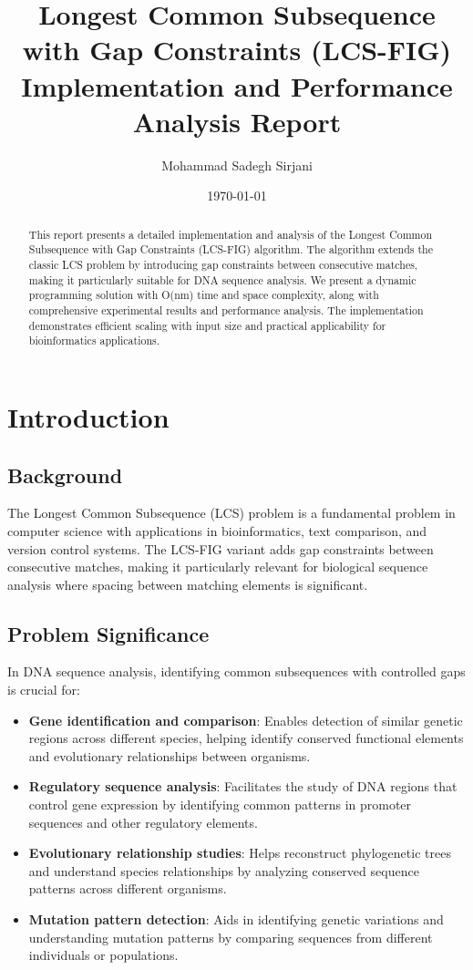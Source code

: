 \documentclass[12pt]{article}
\title{Longest Common Subsequence with Gap Constraints (LCS-FIG)\\
Implementation and Performance Analysis Report}
\author{Mohammad Sadegh Sirjani}
\date{\today}
\begin{document}
\maketitle

\begin{abstract}
This report presents a detailed implementation and analysis of the Longest Common Subsequence with Gap Constraints (LCS-FIG) algorithm. The algorithm extends the classic LCS problem by introducing gap constraints between consecutive matches, making it particularly suitable for DNA sequence analysis. We present a dynamic programming solution with O(nm) time and space complexity, along with comprehensive experimental results and performance analysis. The implementation demonstrates efficient scaling with input size and practical applicability for bioinformatics applications.
\end{abstract}

\section{Introduction}

\subsection{Background}
The Longest Common Subsequence (LCS) problem is a fundamental problem in computer science with applications in bioinformatics, text comparison, and version control systems. The LCS-FIG variant adds gap constraints between consecutive matches, making it particularly relevant for biological sequence analysis where spacing between matching elements is significant.

\subsection{Problem Significance}
In DNA sequence analysis, identifying common subsequences with controlled gaps is crucial for:
\begin{itemize}
    \item \textbf{Gene identification and comparison}: Enables detection of similar genetic regions across different species, helping identify conserved functional elements and evolutionary relationships between organisms.
    \item \textbf{Regulatory sequence analysis}: Facilitates the study of DNA regions that control gene expression by identifying common patterns in promoter sequences and other regulatory elements.
    \item \textbf{Evolutionary relationship studies}: Helps reconstruct phylogenetic trees and understand species relationships by analyzing conserved sequence patterns across different organisms.
    \item \textbf{Mutation pattern detection}: Aids in identifying genetic variations and understanding mutation patterns by comparing sequences from different individuals or populations.
\end{itemize}
\end{document}
